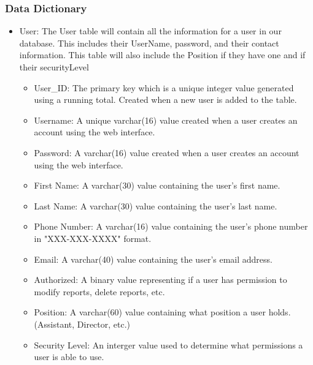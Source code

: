 \documentclass[onecolumn, draftclsnofoot,10pt, compsoc]{IEEEtran}
\begin{document}
\subsubsection{Data Dictionary}
\begin{itemize}
\item User:\newline
The User table will contain all the information for a user in our database. This includes their UserName, password, and their contact information. This table will also include the Position if they have one and if their securityLevel 
\begin{itemize}
\item User\_ID: The primary key which is a unique integer value generated using a running total. Created when a new user is added to the table.
\item Username: A unique varchar(16) value created when a user creates an account using the web interface.
\item Password: A varchar(16) value created when a user creates an account using the web interface.
\item First Name: A varchar(30) value containing the user's first name.
\item Last Name: A varchar(30) value containing the user's last name.
\item Phone Number: A varchar(16) value containing the user's phone number in "XXX-XXX-XXXX" format.
\item Email: A varchar(40) value containing the user's email address.
\item Authorized: A binary value representing if a user has permission to modify reports, delete reports, etc.
\item Position: A varchar(60) value containing what position a user holds. (Assistant, Director, etc.)
\item Security Level: An interger value used to determine what permissions a user is able to use.
\end{itemize}


\end{itemize}
\end{document}
